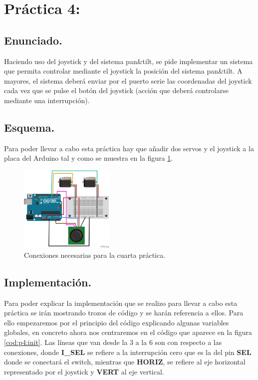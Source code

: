 \documentclass{article}
\begin{document}
\section{Práctica 4: }

\subsection{Enunciado.}

	Haciendo uso del joystick y del sistema pan\&tilt, se pide implementar un sistema que permita controlar mediante el joystick la posición del sistema pan\&tilt. A mayores, el sistema deberá enviar por el puerto serie las coordenadas del joystick cada vez que se pulse el botón del joystick (acción que deberá controlarse mediante una interrupción).

\subsection{Esquema.}

	Para poder llevar a cabo esta práctica hay que añadir dos servos y el joystick a la placa del Arduino tal y como se muestra en la figura \ref{fig:p4:schema}.

\begin{figure}[h]
  \centering
    \includegraphics[width=0.4\textwidth]{img/p4_schema.png}
  \caption{Conexiones necesarias para la cuarta práctica.}
  \label{fig:p4:schema}
\end{figure}

\clearpage

\subsection{Implementación.}

	Para poder explicar la implementación que se realizo para llevar a cabo esta práctica se irán mostrando trozos de código y se harán referencia a ellos. Para ello empezaremos por el principio del código explicando algunas variables globales, en concreto ahora nos centraremos en el código que aparece en la figura \ref{cod:p4:init}. Las líneas que van desde la 3 a la 6 son con respecto a las conexiones, donde \textbf{I\_SEL} se refiere a la interrupción cero que es la del pin \textbf{SEL} donde se conectará el switch, mientras que \textbf{HORIZ}, se refiere al eje horizontal representado por el joystick y \textbf{VERT} al eje vertical.
	
\end{document}
